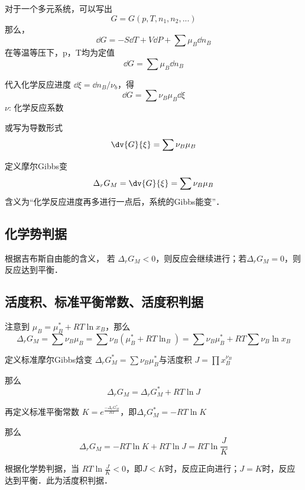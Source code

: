 
\begin{issues}
\issueDraft
\end{issues}


对于一个多元系统，可以写出
\begin{equation}
G=G(p,T,n_1,n_2,...)
\end{equation}
那么，
\begin{equation}
\dd G=-S \dd T +V \dd P + \sum \mu_B \dd n_B
\end{equation}
在等温等压下，p，T均为定值
\begin{equation}
\dd G=\sum \mu_B \dd n_B
\end{equation}

代入化学反应进度 $\dd \xi=\dd n_B/\nu_b$，得
\begin{equation}
\dd G=\sum \nu_B \mu_B \dd \xi
\end{equation}
$\nu$: 化学反应系数

或写为导数形式
\begin{equation}
\dv{G}{\xi}=\sum \nu_B \mu_B
\end{equation}

定义摩尔Gibbs变
\begin{equation}
\Delta _r G_M = \dv{G}{\xi}=\sum \nu_B \mu_B
\end{equation}
含义为“化学反应进度再多进行一点后，系统的Gibbs能变”．

\subsection{化学势判据}
根据吉布斯自由能的含义，
若 $\Delta _r G_M<0$，则反应会继续进行；若$\Delta _r G_M = 0$，则反应达到平衡．

\subsection{活度积、标准平衡常数、活度积判据}
注意到 
$\mu_B=\mu_B^*+RT \ln x_B$，那么
\begin{equation} \label{chemBl_eq1}
\Delta _r G_M =\sum \nu_B \mu_B = \sum \nu_B (\mu_B^*+RT\ln _B)=\sum \nu_B \mu_B^* + RT \sum \nu_B \ln x_B
\end{equation}

定义标准摩尔Gibbs焓变 $\Delta _r G_M^*=\sum \nu_B \mu_B^*$与活度积 $J=\prod x_B^{\nu_B}$

那么
\begin{equation}
\Delta _r G_M = \Delta _r G_M^* + RT \ln J
\end{equation}

再定义标准平衡常数 $K = e^{\frac{-\Delta _r G_M^*}{RT}}$，即$\Delta _r G_M^* = -RT \ln K$

那么 
\begin{equation}
\Delta _r G_M = -RT \ln K + RT \ln J = RT \ln \frac{J}{K}
\end{equation}

根据化学势判据，当 
$RT \ln \frac{J}{K} < 0$，即$J<K$时，反应正向进行；$J=K$时，反应达到平衡．此为活度积判据．